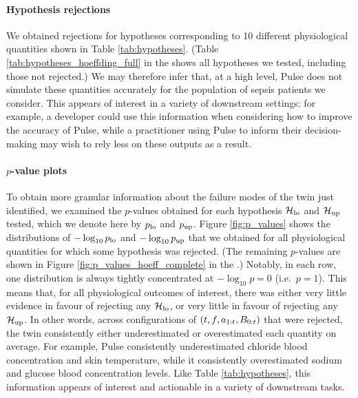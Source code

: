 \paragraph{Hypothesis rejections}
%

We obtained rejections for hypotheses corresponding to 10 different physiological quantities shown in Table \ref{tab:hypotheses}.
(Table \ref{tab:hypotheses_hoeffding_full} in the \AppendixName shows all hypotheses we tested, including those not rejected.)
%
We may therefore infer that, at a high level, Pulse does not simulate these quantities accurately for the population of sepsis patients we consider.
%
This appears of interest in a variety of downstream settings: for example, a developer could use this information when considering how to improve the accuracy of Pulse, while a practitioner using Pulse to inform their decision-making may wish to rely less on these outputs as a result.

%

\paragraph{$p$-value plots}

To obtain more granular information about the failure modes of the twin just identified, we examined the $p$-values obtained for each hypothesis $\mathcal{H}_{\mathrm{lo}}$ and $\mathcal{H}_{\mathrm{up}}$ tested, which we denote here by $p_{\textup{lo}}$ and $p_{\textup{up}}$.
%
Figure \ref{fig:p_values} shows the distributions of $-\log_{10}{p_{\textup{lo}}}$ and $-\log_{10}{p_{\textup{up}}}$ that we obtained for all physiological quantities for which some hypothesis was rejected.
(The remaining $p$-values are shown in Figure \ref{fig:p_values_hoeff_complete} in the \AppendixName.)
%
%
Notably, in each row, one distribution is always tightly concentrated at $-\log_{10} p = 0$ (i.e.\ $p = 1$).
This means that, for all physiological outcomes of interest, there was either very little evidence in favour of rejecting any $\mathcal{H}_{\mathrm{lo}}$, or very little in favour of rejecting any $\mathcal{H}_{\mathrm{up}}$.
In other words, across configurations of $(t, f, a_{1:t}, B_{0:t})$ that were rejected, the twin consistently either underestimated or overestimated each quantity on average.
For example, Pulse consistently underestimated chloride blood concentration and skin temperature, while it consistently overestimated sodium and glucose blood concentration levels.
Like Table \ref{tab:hypotheses}, this information appears of interest and actionable in a variety of downstream tasks.

%
%
%

